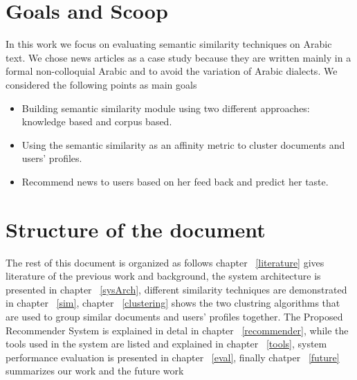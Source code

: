 \section{Goals and Scoop}\label{subsec:goals}
In this work we focus on evaluating semantic similarity techniques on Arabic text. We chose news articles as a case study because they are written mainly in a formal non-colloquial Arabic and to avoid the variation of Arabic dialects.
We considered the following points as main goals
\begin {itemize}
\item Building semantic similarity module using two different approaches: knowledge based and corpus based.
\item Using the semantic similarity as an affinity metric to cluster documents and users' profiles.
\item Recommend news to users based on her feed back and predict her taste.
\end{itemize}

\section{Structure of the document}\label{subsec:struct}
The rest of this document is organized as follows chapter ~\ref{literature} gives literature of the previous work and background, the system architecture is presented in chapter ~\ref{sysArch}, different similarity techniques are demonstrated in chapter ~\ref{sim}, chapter ~\ref{clustering} shows the two clustring algorithms that are used to group similar documents and users' profiles together. The Proposed Recommender System is explained in detal in chapter ~\ref{recommender}, while the tools used in the system are listed and explained in chapter ~\ref{tools}, system performance evaluation is presented in chapter ~\ref{eval}, finally chatper ~\ref{future} summarizes our work and the future work


